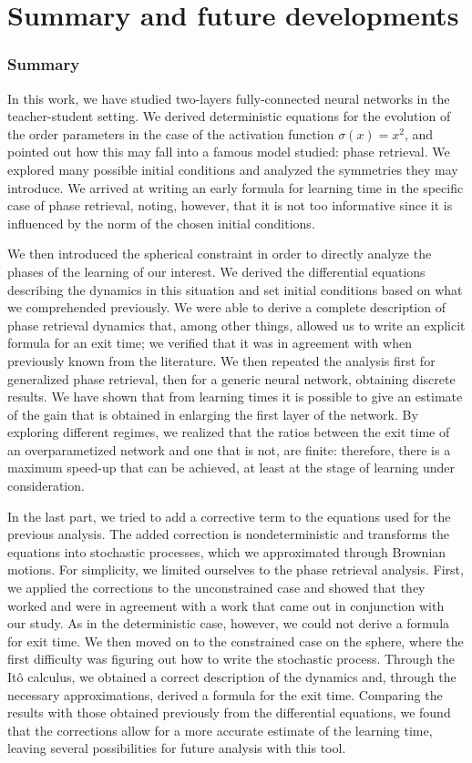 \chapter{Summary and future developments}
\subsection*{Summary}
In this work, we have studied two-layers fully-connected neural networks in the teacher-student setting.
We derived deterministic equations for the evolution of the order parameters in the case of the activation function \(\sigma(x)=x^2\),
and pointed out how this may fall into a famous model studied: phase retrieval.
We explored many possible initial conditions and analyzed the symmetries they may introduce.
We arrived at writing an early formula for learning time in the specific case of phase retrieval, noting,
however, that it is not too informative since it is influenced by the norm of the chosen initial conditions.

We then introduced the spherical constraint in order to directly analyze the phases of the learning of our interest.
We derived the differential equations describing the dynamics in this situation and set initial conditions based on what we comprehended previously.
We were able to derive a complete description of phase retrieval dynamics that, among other things,
allowed us to write an explicit formula for an exit time; we verified that it was in agreement with when previously known from the literature.
We then repeated the analysis first for generalized phase retrieval, then for a generic neural network, obtaining discrete results.
We have shown that from learning times it is possible to give an estimate of the gain that is obtained in enlarging the first layer of the network.
By exploring different regimes, we realized that the ratios between the exit time of an overparametized network and one that is not, are finite:
therefore, there is a maximum speed-up that can be achieved, at least at the stage of learning under consideration.

In the last part, we tried to add a corrective term to the equations used for the previous analysis. The added correction is nondeterministic and transforms the equations into stochastic processes, which we approximated through Brownian motions.
For simplicity, we limited ourselves to the phase retrieval analysis. 
First, we applied the corrections to the unconstrained case and showed that they worked and were in agreement with a work that came out in conjunction with our study.
As in the deterministic case, however, we could not derive a formula for exit time. We then moved on to the constrained case on the sphere, where the first difficulty was figuring out how to write the stochastic process.
Through the Itô calculus, we obtained a correct description of the dynamics and,
through the necessary approximations, derived a formula for the exit time.
Comparing the results with those obtained previously from the differential equations,
we found that the corrections allow for a more accurate estimate of the learning time,
leaving several possibilities for future analysis with this tool. 

